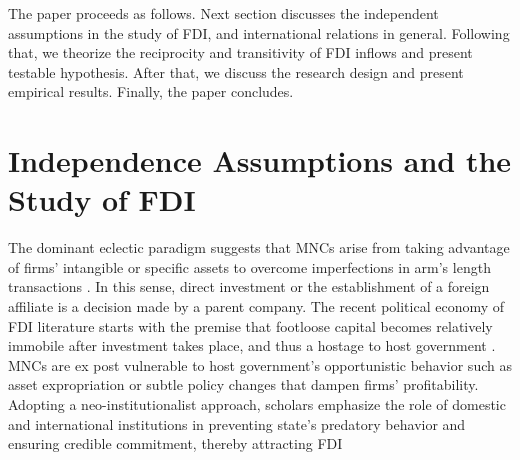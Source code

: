 \documentclass{article}
\begin{document}
The paper proceeds as follows. Next section discusses the independent assumptions in the study of FDI, and international relations in general. Following that, we theorize the reciprocity and transitivity of FDI inflows and present testable hypothesis. After that, we discuss the research design and present empirical results. Finally, the paper concludes.








\section{Independence Assumptions and the Study of FDI}

The dominant eclectic paradigm suggests that MNCs arise from taking advantage of firms' intangible or specific assets to overcome imperfections in arm's length transactions \citep{Caves:1996,Dunning:1992}. In this sense, direct investment or the establishment of a foreign affiliate is a decision made by a parent company. The recent political economy of FDI literature starts with the premise that footloose capital becomes relatively immobile after investment takes place, and thus a hostage to host government \citep{Vernon:1971,Vernon:1980}. MNCs are ex post vulnerable to host government's opportunistic behavior such as asset expropriation or subtle policy changes that dampen firms' profitability. Adopting a neo-institutionalist approach, scholars emphasize the role of domestic and international institutions in preventing state's predatory behavior and ensuring credible commitment, thereby attracting FDI \citep[e.g.][]{Henisz:2000,Jensen:2003,Jensen:2006,Li_Resnick:2003,Staats_Biglaiser:2012,Buthe_Milner:2008,Allee_Peinhardt:2011}
\end{document}
